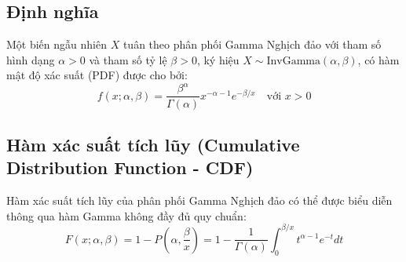 	\subsection{Định nghĩa}
		Một biến ngẫu nhiên $X$ tuân theo phân phối Gamma Nghịch đảo với tham số hình dạng $\alpha > 0$ và tham số tỷ lệ $\beta > 0$, ký hiệu $X \sim \text{InvGamma}(\alpha, \beta)$, có hàm mật độ xác suất (PDF) được cho bởi:
		\[ f(x; \alpha, \beta) = \frac{\beta^\alpha}{\Gamma(\alpha)} x^{-\alpha-1} e^{-\beta/x} \quad \text{với } x > 0 \]
	
	\subsection{Hàm xác suất tích lũy (Cumulative Distribution Function - CDF)}
	Hàm xác suất tích lũy của phân phối Gamma Nghịch đảo có thể được biểu diễn thông qua hàm Gamma không đầy đủ quy chuẩn:
	\[ F(x; \alpha, \beta) = 1 - P\left(\alpha, \frac{\beta}{x}\right) = 1 - \frac{1}{\Gamma(\alpha)} \int_0^{\beta/x} t^{\alpha-1} e^{-t} dt \]
